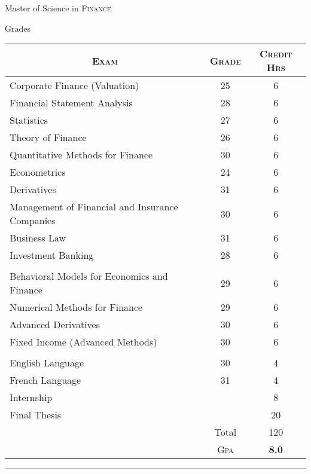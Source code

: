 \documentclass[letterpaper,10pt]{article} %
\begin{document}

\newpage


\par{\centering\Large \hypertarget{grds}{Master of Science in \textsc{Finance}}\par}\large{\centering Grades\par}\normalsize

\begin{center}
\begin{tabular}{lcc}
\multicolumn{1}{c}{\textsc{Exam}} & \textsc{Grade}&\textsc{Credit Hrs}\\ \hline
Corporate Finance (Valuation) & 25 & 6\\
Financial Statement Analysis & 28 & 6\\
Statistics & 27 & 6\\
Theory of Finance & 26 & 6\\
Quantitative Methods for Finance & 30 & 6\\
Econometrics & 24 & 6\\
Derivatives & 31 & 6\\
Management of Financial and Insurance Companies & 30 & 6\\
Business Law & 31 & 6\\
Investment Banking	& 28 & 6\\ \\		
Behavioral Models for Economics and Finance	 & 29 & 6\\
Numerical Methods for Finance & 29 & 6\\
Advanced Derivatives & 30 & 6\\
Fixed Income (Advanced Methods) & 30 & 6\\ \\
English Language & 30 &	4\\
French Language & 31 &	4\\	
Internship & & 8\\		
Final Thesis & & 20\\	
& Total & 120\\\cline{2-3}
&\textsc{Gpa}&\textbf{8.0}
\end{tabular}
\end{center}
\bigskip
\hrule
\bigskip
\end{document}
